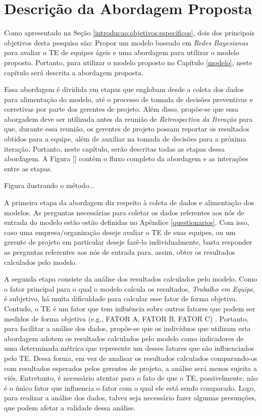 \chapter{Descrição da Abordagem Proposta}
\label{descricao}

Como apresentado na Seção \ref{introducao:objetivos:especificos}, dois dos principais objetivos desta pesquisa são: Propor um modelo baseado em \textit{Redes Bayesianas} para avaliar o TE de equipes ágeis e uma abordagem para utilizar o modelo proposto. Portanto, para utilizar o modelo proposto no Capítulo \ref{modelo}, neste capítulo será descrita a abordagem proposta.

Essa abordagem é dividida em etapas que englobam desde a coleta dos dados para alimentação do modelo, até o processo de tomada de decisões preventivas e corretivas por parte dos gerentes de projeto. Além disso, propõe-se que essa aborgadem deve ser utilizada antes da reunião de \textit{Retrospectiva da Iteração} para que, durante essa reunião, os gerentes de projeto possam reportar os resultados obtidos para a equipe, além de auxiliar na tomada de decisões para a próxima iteração. Portanto, neste capítulo, serão descritas todas as etapas dessa abordagem. A Figura \ref{} contém o fluxo completo da abordagem e as interações entre as etapas.

{\color{red} Figura ilustrando o método...}

A primeira etapa da abordagem diz respeito à coleta de dados e alimentação dos modelos. As perguntas necessárias para coletar os dados referentes aos nós de entrada do modelo estão estão definidas no Apêndice \ref{questionarios}. Com isso, caso uma empresa/organização deseje avaliar o TE de suas equipes, ou um gerente de projeto em particular deseje fazê-lo individualmente, basta responder as perguntas referentes aos nós de entrada para, assim, obter os resultados calculados pelo modelo.

A segunda etapa consiste da análise dos resultados calculados pelo modelo. Como o fator principal para o qual o modelo calcula os resultados, \textit{Trabalho em Equipe}, é subjetivo, há muita dificuldade para calcular esse fator de forma objetiva. Contudo, o TE é um fator que tem influência sobre outros fatores que podem ser medidos de forma objetiva (e.g., FATOR A, FATOR B, FATOR C) \cite{}. Portanto, para facilitar a análise dos dados, propõe-se que os indivíduos que utilizam esta abordagem adotem os resultados calculados pelo modelo como indicadores de uma determinada métrica que represente um desses fatores que são influenciados pelo TE. Dessa forma, em vez de analisar os resultados calculados comparando-os com resultados esperados pelos gerentes de projeto, a análise será menos sujeita a viés. Entretanto, é necessário atentar para o fato de que o TE, possivelmente, não é o único fator que influencia o fator com o qual ele está sendo comparado. Logo, para realizar a análise dos dados, talvez seja necessário fazer algumas presunções, que podem afetar a validade dessa análise.

